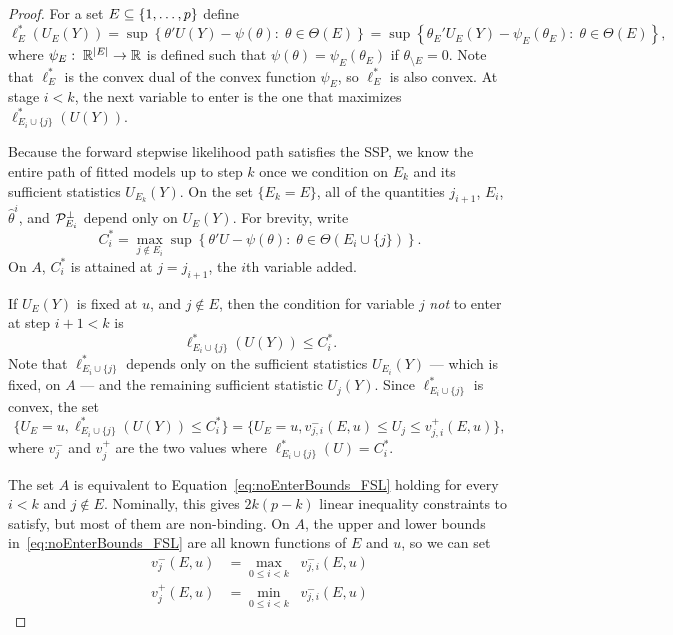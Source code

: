 \documentclass{article}
\begin{document}
\begin{proof}
  For a set $E\subseteq \{1,\ldots,p\}$ define
  \[
  \ell_E^*(U_E(Y)) 
  = \sup\left\{\theta'U(Y) - \psi(\theta) :\; \theta\in \Theta(E) \right\}
  = \sup\left\{\theta_E'U_E(Y) - \psi_E(\theta_E):\; \theta\in\Theta(E) \right\},
  \]
  where $\psi_E:\; \mathbb{R}^{|E|} \rightarrow \mathbb{R}$ is defined such that $\psi(\theta)=\psi_E(\theta_E)$ if $\theta_{\setminus E}=0$. Note that $\ell_E^*$ is the convex dual of the convex function $\psi_E$, so $\ell_E^*$ is also convex. At stage $i<k$, the next variable to enter is the one that maximizes $\ell_{E_i\cup \{j\}}^*(U(Y))$.

  Because the forward stepwise likelihood path satisfies the SSP, we know the entire path of fitted models up to step $k$ once we condition on $E_k$ and its sufficient statistics $U_{E_k}(Y)$. On the set $\{E_k=E\}$, all of the quantities $j_{i+1}$, $E_i$, $\hat\theta^i$, and $\mathcal{P}_{E_i}^\perp$ depend only on $U_E(Y)$. For brevity, write 
  \[
  C_i^* = \max_{j \notin E_i} 
    \sup \left\{ \theta ' U - \psi(\theta):\; \theta \in \Theta(E_i\cup \{j\}) \right\}.
  \]
  On $A$, $C_i^*$ is attained at $j=j_{i+1}$, the $i$th variable added.

  If $U_E(Y)$ is fixed at $u$, and $j \notin E$, then the condition for 
  variable $j$ {\em not} to enter at step $i+1 < k$ is
  \[
  \ell_{E_i\cup \{j\}}^*(U(Y)) \leq C_i^*.
  \]
  Note that $\ell_{E_i\cup \{j\}}^*$ depends only on the sufficient statistics $U_{E_i}(Y)$ --- which is fixed, on $A$ --- and the remaining sufficient statistic $U_j(Y)$. Since $\ell_{E_i\cup\{j\}}^*$ is convex, the set
  \begin{equation}\label{eq:noEnterBounds_FSL}
  \{U_E=u, \ell_{E_i\cup \{j\}}^*(U(Y)) \leq C_i^*\} 
  = \{ U_E=u, v_{j,i}^-(E,u) \leq U_j \leq v_{j,i}^+(E,u)\},
  \end{equation}
  where $v_j^{-}$ and $v_j^+$ are the two values where $\ell_{E_i\cup \{j\}}^*(U)=C_i^*$.

  The set $A$ is equivalent to 
  Equation~\eqref{eq:noEnterBounds_FSL} holding
  for every $i < k$ and $j \notin E$. Nominally, this gives $2k(p-k)$
  linear inequality constraints to satisfy, but most of them are
  non-binding. On $A$, the upper and lower bounds
  in~\eqref{eq:noEnterBounds_FSL}
  are all known functions of $E$ and $u$, so we can set
  \begin{align}\label{eq:vMinus_FSL}
    v_j^-(E,u) &= \max_{0 \leq i < k} \;\;v_{j,i}^-(E,u)\\
    \label{eq:vPlus_FSL}
    v_j^+(E,u) &= \min_{0 \leq i < k} \;\;v_{j,i}^-(E,u)
  \end{align}
\end{proof}
\end{document}

